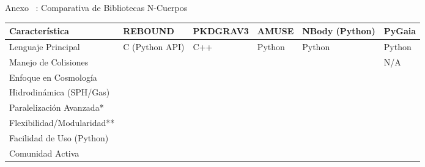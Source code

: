 \begin{frame}{Anexo \thesection~: Comparativa de Bibliotecas N-Cuerpos}
    \centering
    \label{tab:nbody-comparativa-beamer}
    \vspace{-0.1cm}
    \begin{adjustbox}{max width=\textwidth, max height=0.35\textheight, keepaspectratio}
        \renewcommand{\arraystretch}{1.1}
        \begin{tabular}{@{}p{5cm} >{\centering\arraybackslash}p{3.5cm} >{\centering\arraybackslash}p{2.5cm} >{\centering\arraybackslash}p{2.5cm} >{\centering\arraybackslash}p{2.5cm} >{\centering\arraybackslash}p{2.5cm}@{}}
            \toprule
            \textbf{Característica} & \textbf{REBOUND} & \textbf{PKDGRAV3} & \textbf{AMUSE} & \textbf{NBody (Python)} & \textbf{PyGaia} \\
            \midrule
            Lenguaje Principal & C (Python API) & C++ & Python & Python & Python \\
            \midrule
            Manejo de Colisiones & \color{green}{\checkmark} & \color{red}{\xmark} & \color{green}{\checkmark} & \color{red}{\xmark} & N/A \\
            \midrule
            Enfoque en Cosmología & \color{red}{\xmark} & \color{green}{\checkmark} & \color{red}{\xmark} & \color{red}{\xmark} & \color{red}{\xmark} \\
            \midrule
            Hidrodinámica (SPH/Gas) & \color{red}{\xmark} & \color{green}{\checkmark} & \color{green}{\checkmark} & \color{red}{\xmark} & \color{red}{\xmark} \\
            \midrule
            Paralelización Avanzada* & \color{green}{\checkmark} & \color{green}{\checkmark} & \color{green}{\checkmark} & \color{red!40!orange}{Parcial} & \color{red}{\xmark} \\
            \midrule
            Flexibilidad/Modularidad** & \color{green}{\checkmark} & \color{red}{\xmark} & \color{green}{\checkmark} & \color{red!40!orange}{Media} & \color{red}{\xmark} \\
            \midrule
            Facilidad de Uso (Python) & \color{green}{\checkmark} & \color{red}{\xmark} & \color{red}{\xmark} & \color{green}{\checkmark} & \color{green}{\checkmark} \\
            \midrule
            Comunidad Activa & \color{green}{\checkmark} & \color{green}{\checkmark} & \color{green}{\checkmark} & \color{red!40!orange}{Variable} & \color{green}{\checkmark} \\

\end{tabular}
\end{adjustbox}
\end{frame}
